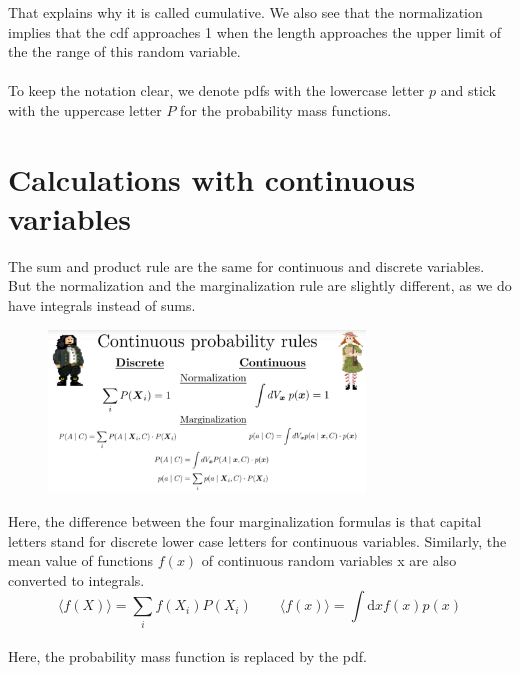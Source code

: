 \documentclass[12pt, a4paper]{scrartcl}
\begin{document}
That explains why it is called cumulative. We also see that the normalization
implies that the cdf approaches 1 when the length approaches the upper
limit of the the range of this random variable.\\

\\

To keep the notation clear, we denote pdfs with the lowercase letter $p$ and
stick with the uppercase letter $P$ for the probability mass functions.\\

\section*{Calculations with continuous variables}
The sum and product rule are the same for continuous and discrete variables.
But the normalization and the marginalization rule are slightly different, as we do have integrals instead of sums. %
 \begin{figure}[H]
	\centering
	\includegraphics[width=0.75\textwidth]{8_1.png}
\end{figure}
Here, the difference between the four marginalization formulas is that capital letters stand for discrete lower case letters for continuous variables. Similarly, the mean value of functions $f(x)$ of continuous random variables x are also converted to integrals. \\
\begin{equation*}\boxed{\langle f(X)\rangle = \sum_i f(X_i)P(X_i)\qquad \langle f(x)\rangle = \int \text{d}x f(x)p(x)
}\end{equation*}\\
Here, the probability mass function is replaced by the pdf.\\
\end{document}
